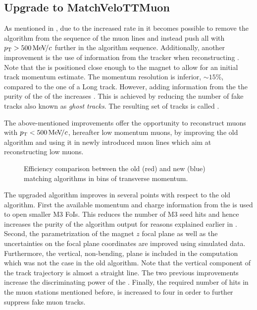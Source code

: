 \subsection{Upgrade to MatchVeloTTMuon}
\label{sec:matchvelottmuon}
As mentioned in , due to the increased \hltone rate in \runtwo it becomes possible to
remove the \mvm algorithm from the sequence of the \hltone muon lines and instead push all \veloTracks with
$\mbox{$p_{\rm T}$}>500 {\mathrm{\,Me\kern -0.1em V\!/}c}$ further in the algorithm sequence. Additionally, another improvement is the use of
information from the \ttracker tracker when reconstructing \veloTracks \cite{LHCb-PUB-2015-005}.
Note that the \ttracker is positioned close enough to the \lhcb magnet to allow for an initial track momentum estimate.
The \ttracker momentum resolution is inferior, $\sim 15\%$, compared to the one of a Long track.
However, adding information from the \ttracker the purity of the of the \veloTracks increases \cite{Bowen:2105078}.
This is achieved by reducing the number of fake tracks also known as {\it ghost tracks}.
The resulting set of tracks is called \veloTTracks.

The above-mentioned improvements offer the opportunity to reconstruct muons with $\mbox{$p_{\rm T}$}<500 {\mathrm{\,Me\kern -0.1em V\!/}c}$,
hereafter low momentum muons, by improving the old \mvm algorithm and using it in newly introduced
\hltone muon lines which aim at reconstructing low \pt muons.

\begin{figure}[t]
  \centering
    \scalebox{.6}{}
  \caption{Efficiency comparison between the old (red) and new (blue) matching algorithms in bins of transverse momentum.}
 \label{mvm_eff_pt_zoom_comp}
\end{figure}

The upgraded \mvTTm algorithm improves in several points with respect to the old \mvm algorithm.
First the available momentum and charge information from the \ttracker is used to open smaller M3 FoIs.
This reduces the number of M3 seed hits and hence increases the purity of the \mvTTm algorithm output
for reasons explained earlier in . Second, the parametrization of the magnet $z$
focal plane as well as the uncertainties on the focal plane coordinates are improved using simulated data.
Furthermore, the vertical, non-bending, plane is included in the \chisq computation which was not the
case in the old \mvm algorithm. Note that the vertical component of the track trajectory is almost a straight
line. The two previous improvements increase the discriminating power of the \chisq. Finally, the required number
of hits in the muon stations mentioned before, is increased to four in order to further
suppress fake muon tracks.

